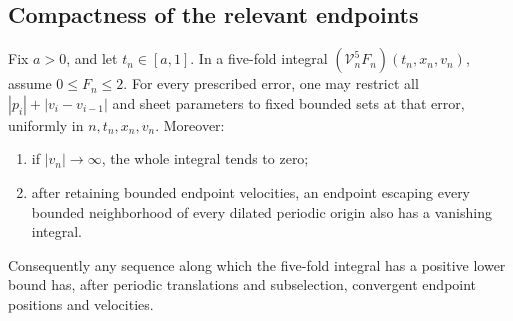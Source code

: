 \subsection{Compactness of the relevant endpoints}

\begin{lemma}
\label{nc:endpoint-tightness}
Fix \(a>0\), and let \(t_n\in[a,1]\).  In a five-fold integral
\((\mathcal V_n^5F_n)(t_n,x_n,v_n)\), assume \(0\le F_n\le2\).
For every prescribed error, one may restrict all
\(|p_i|+|v_i-v_{i-1}|\) and sheet parameters to fixed bounded sets at
that error, uniformly in \(n,t_n,x_n,v_n\).  Moreover:
\begin{enumerate}[label=\textup{(\roman*)}]
\item if \(|v_n|\to\infty\), the whole integral tends to zero;
\item after retaining bounded endpoint velocities, an endpoint
escaping every bounded neighborhood of every dilated periodic origin
also has a vanishing integral.
\end{enumerate}
Consequently any sequence along which the five-fold integral has a
positive lower bound has, after periodic translations and
subselection, convergent endpoint positions and velocities.
\end{lemma}

